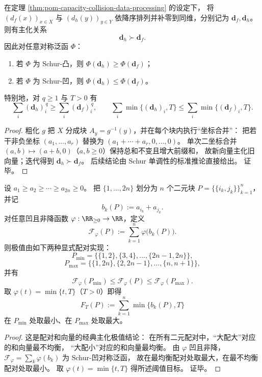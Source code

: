 \begin{theorem}\label{thm:pom-coarsegraining-majorization-schur}
在定理 \ref{thm:pom-capacity-collision-data-processing} 的设定下，
将 \((d_f(x))_{x\in X}\) 与 \((d_h(y))_{y\in Y}\) 依降序排列并补零到同维，分别记为 \(\mathbf d_f,\mathbf d_h\)。
则有主化关系
\[
\mathbf d_h\succ \mathbf d_f.
\]
因此对任意对称泛函 \(\Phi\)：
\begin{enumerate}
  \item 若 \(\Phi\) 为 Schur-凸，则 \(\Phi(\mathbf d_h)\ge \Phi(\mathbf d_f)\)；
  \item 若 \(\Phi\) 为 Schur-凹，则 \(\Phi(\mathbf d_h)\le \Phi(\mathbf d_f)\)。
\end{enumerate}
特别地，对 \(q\ge 1\) 与 \(T>0\) 有
\[
\sum_i (\mathbf d_h)_i^{\,q}\ge \sum_i (\mathbf d_f)_i^{\,q},
\qquad
\sum_i \min\{(\mathbf d_h)_i,T\}\le \sum_i \min\{(\mathbf d_f)_i,T\}.
\]
\end{theorem}
\begin{proof}
粗化 \(g\) 把 \(X\) 分成块 \(A_y=g^{-1}(y)\)，并在每个块内执行“坐标合并”：
把若干非负坐标 \((a_1,\dots,a_r)\) 替换为 \((a_1+\cdots+a_r,0,\dots,0)\)。
单次二坐标合并 \((a,b)\mapsto(a+b,0)\)（\(a,b\ge 0\)）保持总和不变且增大前缀和，
故新向量主化旧向量；迭代得到 \(\mathbf d_h\succ \mathbf d_f\)。
后续结论由 Schur 单调性的标准推论直接给出。
证毕。
\end{proof}

\begin{proposition}[二元粗化的凹目标极值配对律]\label{prop:pom-binary-coarsegraining-concave-pairing-extremes}
设 \(a_1\ge a_2\ge\cdots\ge a_{2n}\ge 0\)。
把 \(\{1,\dots,2n\}\) 划分为 \(n\) 个二元块 \(P=\{\{i_k,j_k\}\}_{k=1}^n\)，并记
\[
b_k(P):=a_{i_k}+a_{j_k}.
\]
对任意凹且非降函数 \(\varphi:\RR_{\ge 0}\to\RR\)，定义
\[
\mathcal F_\varphi(P):=\sum_{k=1}^n \varphi\!\bigl(b_k(P)\bigr).
\]
则极值由如下两种显式配对实现：
\[
P_{\min}=\{\{1,2\},\{3,4\},\dots,\{2n-1,2n\}\},
\]
\[
P_{\max}=\{\{1,2n\},\{2,2n-1\},\dots,\{n,n+1\}\},
\]
并有
\[
\mathcal F_\varphi(P_{\min})\le \mathcal F_\varphi(P)\le \mathcal F_\varphi(P_{\max}).
\]
取 \(\varphi(t)=\min\{t,T\}\)（\(T>0\)）即得
\[
F_T(P):=\sum_{k=1}^n\min\{b_k(P),T\}
\]
在 \(P_{\min}\) 处取最小、在 \(P_{\max}\) 处取最大。
\end{proposition}
\begin{proof}
这是配对和向量的经典主化极值结论：
在所有二元配对中，“大配大”对应的和向量最不均衡，
“大配小”对应的和向量最均衡。
由 \(\varphi\) 凹且非降，\(\mathcal F_\varphi=\sum_k\varphi(b_k)\) 为 Schur-凹对称泛函，
故在最均衡配对处取最大，在最不均衡配对处取最小。
取 \(\varphi(t)=\min\{t,T\}\) 得所述阈值目标。
证毕。
\end{proof}

